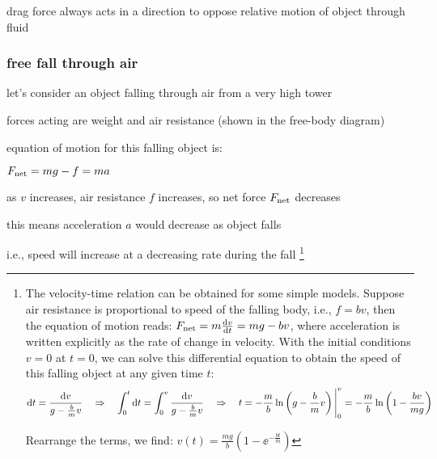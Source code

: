\cmt drag force always acts in a direction to oppose relative motion of object through fluid




\subsubsection*{free fall through air}

\begin{wrapfigure}{r}{0.15\textwidth}
	\vspace*{-16pt}
	\centering
	\vspace*{-16pt}
\end{wrapfigure}

let's consider an object falling through air from a very high tower

forces acting are weight and air resistance (shown in the free-body diagram)

equation of motion for this falling object is:

{
	\centering
	
	$ F_\text{net} = mg - f = ma $
	
}

as $v$ increases, air resistance $f$ increases, so net force $F_\text{net}$ decreases

this means acceleration $a$ would decrease as object falls

i.e., speed will increase at a decreasing rate during the fall
\footnote{The velocity-time relation can be obtained for some simple models. Suppose air resistance is proportional to speed of the falling body, i.e., $f=bv$, then the equation of motion reads: $F_\text{net} = m \frac{\mathrm{d} v}{\mathrm{d} t} = mg - bv$, where acceleration is written explicitly as the rate of change in velocity. With the initial conditions $v=0$ at $t=0$, we can solve this differential equation to obtain the speed of this falling object at any given time $t$:
\begin{equation*}
	\mathrm{d} t = \frac{\mathrm{d} v}{g - \frac{b}{m}v} \quad \Rightarrow \quad \int_0^t \mathrm{d} t = \int_0^v \frac{\mathrm{d} v}{g - \frac{b}{m}v} \quad \Rightarrow \quad t = -\frac{m}{b} \ln \left(g - \frac{b}{m}v \right) \Bigg|_0^v = -\frac{m}{b} \ln \left( 1 - \frac{bv}{mg}\right)
\end{equation*}
	
Rearrange the terms, we find: $v(t) = \frac{mg}{b} \left(1 - \ee^{-\frac{bt}{m}} \right) $}

